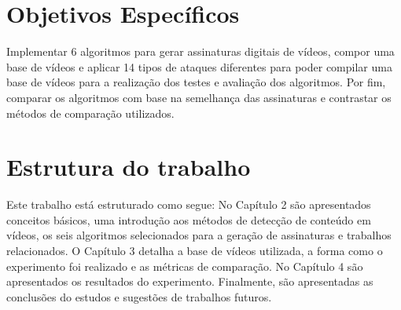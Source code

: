 \section{Objetivos Específicos}

Implementar 6 algoritmos para gerar assinaturas digitais de vídeos, compor uma base de vídeos e aplicar 14 tipos de ataques diferentes para poder compilar uma base de vídeos para a realização dos testes e avaliação dos algoritmos. Por fim, comparar os algoritmos com base na semelhança das assinaturas e contrastar os métodos de comparação utilizados.

\section{Estrutura do trabalho}
Este trabalho está estruturado como segue: No Capítulo 2 são apresentados conceitos básicos, uma introdução aos métodos de detecção de conteúdo em vídeos, os seis algoritmos selecionados para a geração de assinaturas e trabalhos relacionados. O Capítulo 3 detalha a base de vídeos utilizada, a forma como o experimento foi realizado e as métricas de comparação. No Capítulo 4 são apresentados os resultados do experimento. Finalmente, são apresentadas as conclusões do estudos e sugestões de trabalhos futuros.















